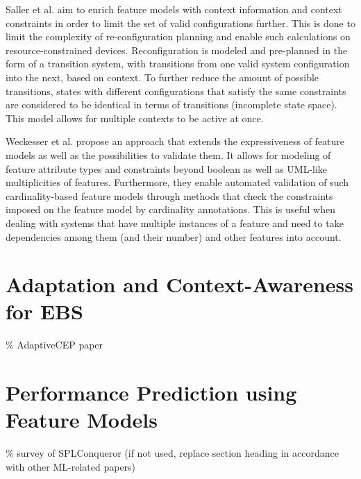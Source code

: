 Saller et al. aim to enrich feature models with context information and context constraints in order to limit the set of valid configurations further. This is done to limit the complexity of re-configuration planning and enable such calculations on resource-constrained devices. Reconfiguration is modeled and pre-planned in the form of a transition system, with transitions from one valid system configuration into the next, based on context. To further reduce the amount of possible transitions, states with different configurations that satisfy the same constraints are considered to be identical in terms of transitions (incomplete state space). This model allows for multiple contexts to be active at once.

Weckesser et al. propose an approach that extends the expressiveness of feature models as well as the possibilities to validate them. It allows for modeling  of feature attribute types and constraints beyond boolean as well as UML-like multiplicities of features. Furthermore, they enable automated validation of such cardinality-based feature models through methods that check the constraints imposed on the feature model by cardinality annotations. This is useful when dealing with systems that have multiple instances of a feature and need to take dependencies among them (and their number) and other features into account.

\section{Adaptation and Context-Awareness for EBS}
\% AdaptiveCEP paper

\section{Performance Prediction using Feature Models}
\% survey of SPLConqueror (if not used, replace section heading in accordance with other ML-related papers)

